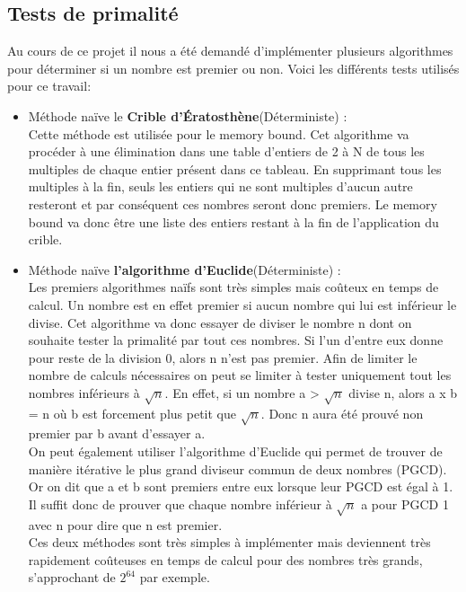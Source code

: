 		\subsection{Tests de primalité}
		Au cours de ce projet il nous a été demandé d'implémenter plusieurs algorithmes pour déterminer si un nombre est premier ou non. Voici les différents tests utilisés pour ce travail:
		\begin{itemize}
			\item Méthode naïve le \textbf{Crible d’Ératosthène}\cite{eratosthene}(Déterministe) : \\
			Cette méthode est utilisée pour le memory bound. Cet algorithme va procéder à une élimination dans une table d'entiers de 2 à N de tous les multiples de chaque entier présent dans ce tableau. En supprimant tous les multiples à la fin, seuls les entiers qui ne sont multiples d'aucun autre resteront et par conséquent ces nombres seront donc premiers. Le memory bound va donc être une liste des entiers restant à la fin de l'application du crible.\\
			
			\item Méthode naïve \textbf{l'algorithme d'Euclide}\cite{euclide}(Déterministe) :\\ 
			Les premiers algorithmes naïfs sont très simples mais coûteux en temps de calcul. Un nombre est en effet premier si aucun nombre qui lui est inférieur le divise. Cet algorithme va donc essayer de diviser le nombre n dont on souhaite tester la primalité par tout ces nombres. Si l'un d'entre eux donne pour reste de la division 0, alors n n'est pas premier. Afin de limiter le nombre de calculs nécessaires on peut se limiter à tester uniquement tout les nombres inférieurs à $\sqrt{n}$. En effet, si un nombre a > $\sqrt{n}$ divise n, alors a x b = n où b est forcement plus petit que $\sqrt{n}$. Donc n aura été prouvé non premier par b avant d'essayer a.\\
On peut également utiliser l'algorithme d'Euclide qui permet de trouver de manière itérative le plus grand diviseur commun de deux nombres (PGCD). Or on dit que a et b sont premiers entre eux lorsque leur PGCD est égal à 1. Il suffit donc de prouver que chaque nombre inférieur à $\sqrt{n}$ a pour PGCD 1 avec n pour dire que n est premier.
\\
Ces deux méthodes sont très simples à implémenter mais deviennent très rapidement coûteuses en temps de calcul pour des nombres très grands, s'approchant de $2^{64}$ par exemple.\\
			

\end{itemize}
